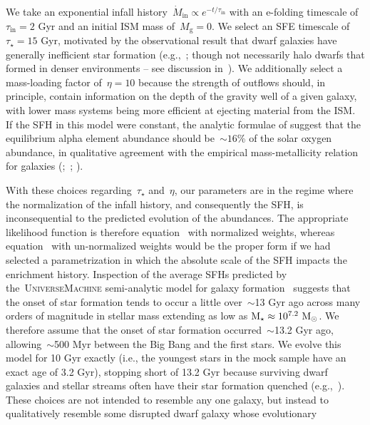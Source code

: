 \documentclass[foo.tex]{subfiles}
\begin{document}
We take an exponential infall history~$\dot{M}_\text{in} \propto e^{-t /
\tau_\text{in}}$ with an e-folding timescale of~$\tau_\text{in} = 2$ Gyr and an
initial ISM mass of~$M_\text{g} = 0$.
We select an SFE timescale of~$\tau_\star = 15$ Gyr, motivated by the
observational result that dwarf galaxies have generally inefficient star
formation (e.g.,~\citealp{Hudson2015}; though not necessarily halo dwarfs that
formed in denser environments -- see discussion in~\citealt{Naidu2022}).
We additionally select a mass-loading factor of~$\eta = 10$ because the
strength of outflows should, in principle, contain information on the depth of
the gravity well of a given galaxy, with lower mass systems being more
efficient at ejecting material from the ISM.
If the SFH in this model were constant, the analytic formulae of
\citet{Weinberg2017} suggest that the equilibrium alpha element abundance
should be~$\sim16$\% of the solar oxygen abundance, in qualitative agreement
with the empirical mass-metallicity relation for galaxies
(\citealp{Tremonti2004, Gallazzi2005};~\citealp*{Zahid2011};
\citealp{Andrews2013, Kirby2013, Zahid2014}).
\par
With these choices regarding~$\tau_\star$ and~$\eta$, our parameters are in
the regime where the normalization of the infall history, and consequently the
SFH, is inconsequential to the predicted evolution of the abundances.
The appropriate likelihood function is therefore equation~
with normalized weights, whereas equation~ with
un-normalized weights would be the proper form if we had selected a
parametrization in which the absolute scale of the SFH impacts the enrichment
history.
Inspection of the average SFHs predicted by the~\textsc{UniverseMachine}
semi-analytic model for galaxy formation~\citep{Behroozi2019} suggests that the
onset of star formation tends to occur a little over~$\sim$13 Gyr ago across
many orders of magnitude in stellar mass extending as low as
$\text{M}_\star \approx 10^{7.2}~\text{M}_\odot$.
We therefore assume that the onset of star formation occurred~$\sim$13.2 Gyr
ago, allowing~$\sim$500 Myr between the Big Bang and the first stars.
We evolve this model for 10 Gyr exactly (i.e., the youngest stars in the mock
sample have an exact age of 3.2 Gyr), stopping short of 13.2 Gyr because
surviving dwarf galaxies and stellar streams often have their star formation
quenched (e.g.,~\citealp{Monelli2010a, Monelli2010b, Sohn2013, Weisz2014a,
Weisz2014b, Weisz2015}).
These choices are not intended to resemble any one galaxy, but instead to
qualitatively resemble some disrupted dwarf galaxy whose evolutionary
\end{document}
